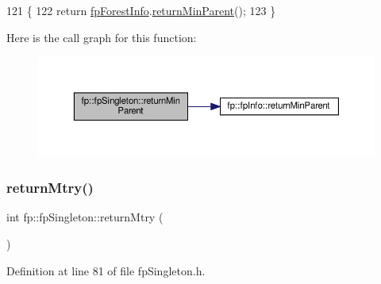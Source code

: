 \begin{DoxyCode}
121                                         \{
122                 \textcolor{keywordflow}{return} \hyperlink{classfp_1_1fpSingleton_a85965009befa72a749ae498fa5b6ccfa}{fpForestInfo}.\hyperlink{classfp_1_1fpInfo_a64d8c3c57e3684a8dd829ed12ddcec0f}{returnMinParent}();
123             \}
\end{DoxyCode}
Here is the call graph for this function\+:
\nopagebreak
\begin{figure}[H]
\begin{center}
\leavevmode
\includegraphics[width=350pt]{classfp_1_1fpSingleton_a2d06406b6462099e0adb393218090420_cgraph}
\end{center}
\end{figure}
\mbox{\label{classfp_1_1fpSingleton_a45ae68ceb91880ddbc0e049a47c371eb}} 
\subsubsection{\texorpdfstring{return\+Mtry()}{returnMtry()}}
{\footnotesize\ttfamily int fp\+::fp\+Singleton\+::return\+Mtry (\begin{DoxyParamCaption}{ }\end{DoxyParamCaption})\hspace{0.3cm}{\ttfamily [inline]}}



Definition at line 81 of file fp\+Singleton.\+h.


